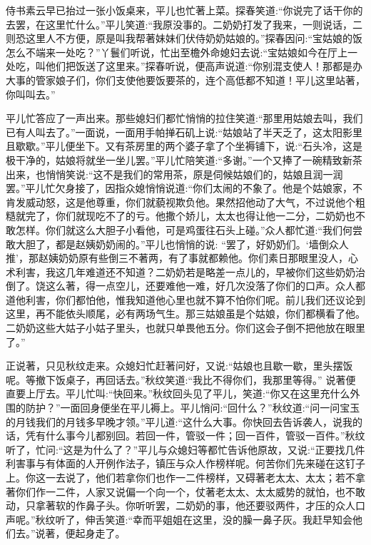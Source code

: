 \begin{parag}
    侍书素云早已抬过一张小饭桌来，平儿也忙著上菜。探春笑道:“你说完了话干你的去罢，在这里忙什么。”平儿笑道:“我原没事的。二奶奶打发了我来，一则说话，二则恐这里人不方便，原是叫我帮著妹妹们伏侍奶奶姑娘的。”探春因问:“宝姑娘的饭怎么不端来一处吃？”丫鬟们听说，忙出至檐外命媳妇去说:“宝姑娘如今在厅上一处吃，叫他们把饭送了这里来。”探春听说，便高声说道:“你别混支使人！那都是办大事的管家娘子们，你们支使他要饭要茶的，连个高低都不知道！平儿这里站著，你叫叫去。”
\end{parag}


\begin{parag}
    平儿忙答应了一声出来。那些媳妇们都忙悄悄的拉住笑道:“那里用姑娘去叫，我们已有人叫去了。”一面说，一面用手帕掸石矶上说:“姑娘站了半天乏了，这太阳影里且歇歇。”平儿便坐下。又有茶房里的两个婆子拿了个坐褥铺下，说:“石头冷，这是极干净的，姑娘将就坐一坐儿罢。”平儿忙陪笑道:“多谢。”一个又捧了一碗精致新茶出来，也悄悄笑说:“这不是我们的常用茶，原是伺候姑娘们的，姑娘且润一润罢。”平儿忙欠身接了，因指众媳悄悄说道:“你们太闹的不象了。他是个姑娘家，不肯发威动怒，这是他尊重，你们就藐视欺负他。果然招他动了大气，不过说他个粗糙就完了，你们就现吃不了的亏。他撒个娇儿，太太也得让他一二分，二奶奶也不敢怎样。你们就这么大胆子小看他，可是鸡蛋往石头上碰。”众人都忙道:“我们何尝敢大胆了，都是赵姨奶奶闹的。”平儿也悄悄的说: “罢了，好奶奶们。‘墙倒众人推’，那赵姨奶奶原有些倒三不著两，有了事就都赖他。你们素日那眼里没人，心术利害，我这几年难道还不知道？二奶奶若是略差一点儿的，早被你们这些奶奶治倒了。饶这么著，得一点空儿，还要难他一难，好几次没落了你们的口声。众人都道他利害，你们都怕他，惟我知道他心里也就不算不怕你们呢。前儿我们还议论到这里，再不能依头顺尾，必有两场气生。那三姑娘虽是个姑娘，你们都横看了他。二奶奶这些大姑子小姑子里头，也就只单畏他五分。你们这会子倒不把他放在眼里了。”
\end{parag}


\begin{parag}
    正说著，只见秋纹走来。众媳妇忙赶著问好，又说:“姑娘也且歇一歇，里头摆饭呢。等撤下饭桌子，再回话去。”秋纹笑道:“我比不得你们，我那里等得。” 说著便直要上厅去。平儿忙叫:“快回来。”秋纹回头见了平儿，笑道:“你又在这里充什么外围的防护？”一面回身便坐在平儿褥上。平儿悄问:“回什么？”秋纹道:“问一问宝玉的月钱我们的月钱多早晚才领。”平儿道:“这什么大事。你快回去告诉袭人，说我的话，凭有什么事今儿都别回。若回一件，管驳一件；回一百件，管驳一百件。”秋纹听了，忙问:“这是为什么了？”平儿与众媳妇等都忙告诉他原故，又说:“正要找几件利害事与有体面的人开例作法子，镇压与众人作榜样呢。何苦你们先来碰在这钉子上。你这一去说了，他们若拿你们也作一二件榜样，又碍著老太太、太太；若不拿著你们作一二件，人家又说偏一个向一个，仗著老太太、太太威势的就怕，也不敢动，只拿著软的作鼻子头。你听听罢，二奶奶的事，他还要驳两件，才压的众人口声呢。”秋纹听了，伸舌笑道:“幸而平姐姐在这里，没的臊一鼻子灰。我赶早知会他们去。”说著，便起身走了。
\end{parag}


